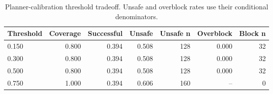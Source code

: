 \begin{table}[t]
\centering
\small
\begin{tabular}{lrrrrrr}
\toprule
Threshold & Coverage & Successful & Unsafe & Unsafe n & Overblock & Block n \\
\midrule
0.150 & 0.800 & 0.394 & 0.508 & 128 & 0.000 & 32 \\
0.300 & 0.800 & 0.394 & 0.508 & 128 & 0.000 & 32 \\
0.500 & 0.800 & 0.394 & 0.508 & 128 & 0.000 & 32 \\
0.750 & 1.000 & 0.394 & 0.606 & 160 & -- & 0 \\
\bottomrule
\end{tabular}
\caption{Planner-calibration threshold tradeoff. Unsafe and overblock rates use their conditional denominators.}
\label{tab:rq4_threshold_tradeoff}
\end{table}
